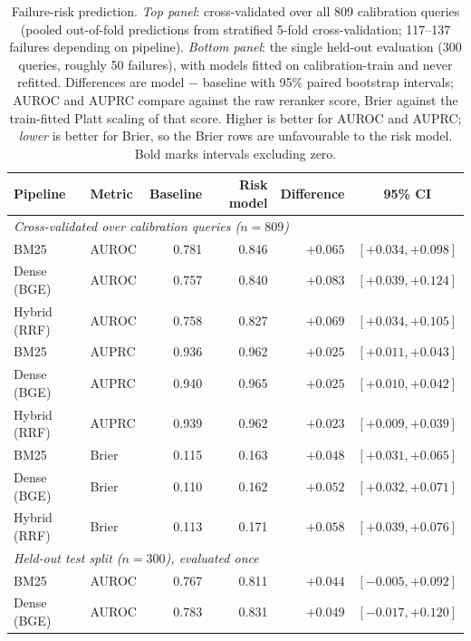 \documentclass[11pt,a4paper]{article}
\begin{document}
\begin{table}[tbp]
\centering
\small
\caption{Failure-risk prediction. \emph{Top panel}: cross-validated over all 809 calibration
queries (pooled out-of-fold predictions from stratified 5-fold cross-validation; 117--137
failures depending on pipeline). \emph{Bottom panel}: the single held-out evaluation (300
queries, roughly 50 failures), with models fitted on calibration-train and never refitted.
Differences are model $-$ baseline with 95\% paired bootstrap intervals; AUROC and AUPRC compare
against the raw reranker score, Brier against the train-fitted Platt scaling of that score.
Higher is better for AUROC and AUPRC; \emph{lower} is better for Brier, so the Brier rows are
unfavourable to the risk model. Bold marks intervals excluding zero.}
\label{tab:risk}
\footnotesize
\begin{tabular}{llrrrc}
\toprule
Pipeline & Metric & Baseline & Risk model & Difference & 95\% CI \\
\midrule
\multicolumn{6}{l}{\emph{Cross-validated over calibration queries ($n = 809$)}} \\
BM25         & AUROC & 0.781 & 0.846 & $\mathbf{+0.065}$ & $\mathbf{[+0.034, +0.098]}$ \\
Dense (BGE)  & AUROC & 0.757 & 0.840 & $\mathbf{+0.083}$ & $\mathbf{[+0.039, +0.124]}$ \\
Hybrid (RRF) & AUROC & 0.758 & 0.827 & $\mathbf{+0.069}$ & $\mathbf{[+0.034, +0.105]}$ \\
BM25         & AUPRC & 0.936 & 0.962 & $\mathbf{+0.025}$ & $\mathbf{[+0.011, +0.043]}$ \\
Dense (BGE)  & AUPRC & 0.940 & 0.965 & $\mathbf{+0.025}$ & $\mathbf{[+0.010, +0.042]}$ \\
Hybrid (RRF) & AUPRC & 0.939 & 0.962 & $\mathbf{+0.023}$ & $\mathbf{[+0.009, +0.039]}$ \\
BM25         & Brier & 0.115 & 0.163 & $\mathbf{+0.048}$ & $\mathbf{[+0.031, +0.065]}$ \\
Dense (BGE)  & Brier & 0.110 & 0.162 & $\mathbf{+0.052}$ & $\mathbf{[+0.032, +0.071]}$ \\
Hybrid (RRF) & Brier & 0.113 & 0.171 & $\mathbf{+0.058}$ & $\mathbf{[+0.039, +0.076]}$ \\
\midrule
\multicolumn{6}{l}{\emph{Held-out test split ($n = 300$), evaluated once}} \\
BM25         & AUROC & 0.767 & 0.811 & $+0.044$ & $[-0.005, +0.092]$ \\
Dense (BGE)  & AUROC & 0.783 & 0.831 & $+0.049$ & $[-0.017, +0.120]$ \\

\end{tabular}
\end{table}
\end{document}
